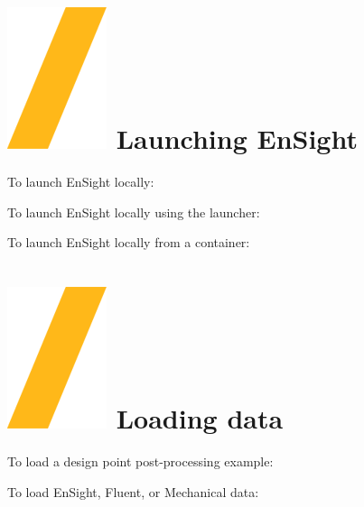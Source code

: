 \documentclass[9pt,landscape]{article}
\begin{document}
\begin{multicols}{3}
\setlength{\premulticols}{0.5pt}
\setlength{\postmulticols}{0.5pt}
\setlength{\multicolsep}{0.5pt}
\setlength{\columnsep}{1pt}


\section{\includegraphics[height=\fontcharht\font`\S]{slash.png} Launching EnSight}


To launch EnSight locally:


To launch EnSight locally using the launcher:

To launch EnSight locally from a container:




\section{\includegraphics[height=\fontcharht\font`\S]{slash.png} Loading data}

To load a design point post-processing example:


To load EnSight, Fluent, or Mechanical data:


\end{multicols}
\end{document}
